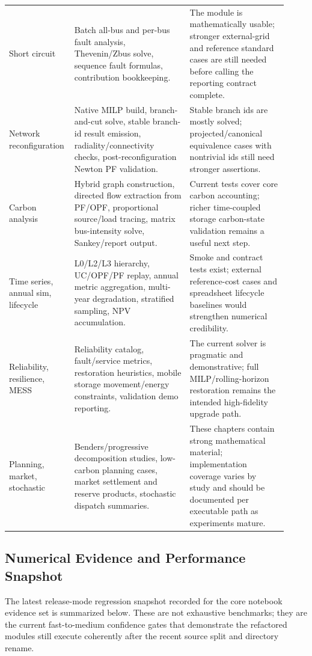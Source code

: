 \begin{longtable}{@{}L{0.18\linewidth}L{0.40\linewidth}L{0.34\linewidth}@{}}
Short circuit & Batch all-bus and per-bus fault analysis, Thevenin/Zbus solve, sequence fault formulas, contribution bookkeeping. & The module is mathematically usable; stronger external-grid and reference standard cases are still needed before calling the reporting contract complete. \\
Network reconfiguration & Native MILP build, branch-and-cut solve, stable branch-id result emission, radiality/connectivity checks, post-reconfiguration Newton PF validation. & Stable branch ids are mostly solved; projected/canonical equivalence cases with nontrivial ids still need stronger assertions. \\
Carbon analysis & Hybrid graph construction, directed flow extraction from PF/OPF, proportional source/load tracing, matrix bus-intensity solve, Sankey/report output. & Current tests cover core carbon accounting; richer time-coupled storage carbon-state validation remains a useful next step. \\
Time series, annual sim, lifecycle & L0/L2/L3 hierarchy, UC/OPF/PF replay, annual metric aggregation, multi-year degradation, stratified sampling, NPV accumulation. & Smoke and contract tests exist; external reference-cost cases and spreadsheet lifecycle baselines would strengthen numerical credibility. \\
Reliability, resilience, MESS & Reliability catalog, fault/service metrics, restoration heuristics, mobile storage movement/energy constraints, validation demo reporting. & The current solver is pragmatic and demonstrative; full MILP/rolling-horizon restoration remains the intended high-fidelity upgrade path. \\
Planning, market, stochastic & Benders/progressive decomposition studies, low-carbon planning cases, market settlement and reserve products, stochastic dispatch summaries. & These chapters contain strong mathematical material; implementation coverage varies by study and should be documented per executable path as experiments mature. \\
\bottomrule
\end{longtable}

\subsection{Numerical Evidence and Performance Snapshot}

The latest release-mode regression snapshot recorded for the core notebook
evidence set is summarized below.  These are not exhaustive benchmarks; they are
the current fast-to-medium confidence gates that demonstrate the refactored
modules still execute coherently after the recent source split and directory
rename.

